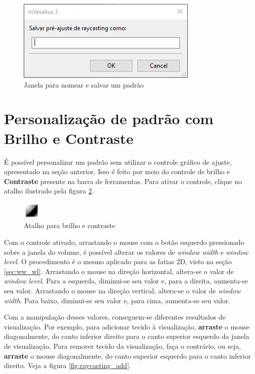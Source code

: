 \begin{figure}[!htb]
\centering
\includegraphics[scale=0.7]{../user_guide_figures/invesalius_screen/save_window_preset_pt.png}
\caption{Janela para nomear e salvar um padrão}
\label{fig:save_window_preset}
\end{figure}

\section{Personalização de padrão com Brilho e Contraste}

É possível personalizar um padrão sem utilizar o controle gráfico de ajuste, apresentado na seção
anterior. Isso é feito por meio do controle de brilho e \textbf{Contraste} presente na barra de
ferramentas. Para ativar o controle, clique no atalho ilustrado pela figura
\ref{fig:tool_contrast_original_vol}.

\begin{figure}[!htb]
\centering
\includegraphics[scale=0.6]{../user_guide_figures/icons/tool_contrast_original.png}
\caption{Atalho para brilho e contraste}
\label{fig:tool_contrast_original_vol}
\end{figure}

Com o controle ativado, arrastando o mouse com o botão esquerdo pressionado
sobre a janela do volume, é possível alterar os valores de \textit{window width} e
\textit{window level}. O procedimento é o mesmo aplicado para as fatias 2D, visto
na seção \ref{sec:ww_wl}. Arrastando o mouse na direção horizontal, altera-se o valor de
\textit{window level}. Para a esquerda, diminui-se seu valor e, para a direita,
aumenta-se seu valor. Arrastando o mouse na direção vertical, altera-se o valor de
\textit{window width}. Para baixo, diminui-se seu valor e, para cima, aumenta-se seu
valor.

Com a manipulação desses valores, conseguem-se diferentes resultados de
visualização. Por exemplo, para adicionar tecido à visualização, \textbf{arraste} o
mouse diagonalmente, do canto inferior direito para o canto superior esquerdo da janela
de visualização. Para remover tecido da visualização, faça o contrário, ou seja,
\textbf{arraste} o mouse diagonalmente, do canto superior esquerdo para o canto inferior
direito. Veja a figura \ref{fig:raycasting_add}.

